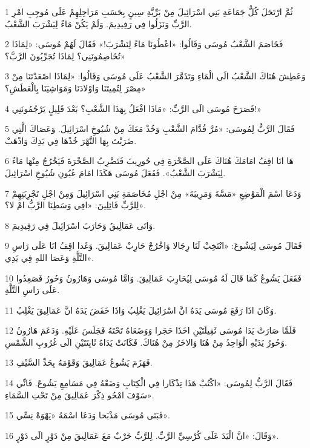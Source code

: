 \par 1 ثُمَّ ارْتَحَلَ كُلُّ جَمَاعَةِ بَنِي اسْرَائِيلَ مِنْ بَرِّيَّةِ سِينٍ بِحَسَبِ مَرَاحِلِهِمْ عَلَى مُوجِبِ امْرِ الرَّبِّ وَنَزَلُوا فِي رَفِيدِيمَ. وَلَمْ يَكُنْ مَاءٌ لِيَشْرَبَ الشَّعْبُ.
\par 2 فَخَاصَمَ الشَّعْبُ مُوسَى وَقَالُوا: «اعْطُونَا مَاءً لِنَشْرَبَ!» فَقَالَ لَهُمْ مُوسَى: «لِمَاذَا تُخَاصِمُونَنِي؟ لِمَاذَا تُجَرِّبُونَ الرَّبَّ؟»
\par 3 وَعَطِشَ هُنَاكَ الشَّعْبُ الَى الْمَاءِ وَتَذَمَّرَ الشَّعْبُ عَلَى مُوسَى وَقَالُوا: «لِمَاذَا اصْعَدْتَنَا مِنْ مِصْرَ لِتُمِيتَنَا وَاوْلادَنَا وَمَوَاشِيَنَا بِالْعَطَشِ؟»
\par 4 فَصَرَخَ مُوسَى الَى الرَّبِّ: «مَاذَا افْعَلُ بِهَذَا الشَّعْبِ؟ بَعْدَ قَلِيلٍ يَرْجُمُونَنِي!»
\par 5 فَقَالَ الرَّبُّ لِمُوسَى: «مُرَّ قُدَّامَ الشَّعْبِ وَخُذْ مَعَكَ مِنْ شُيُوخِ اسْرَائِيلَ. وَعَصَاكَ الَّتِي ضَرَبْتَ بِهَا النَّهْرَ خُذْهَا فِي يَدِكَ وَاذْهَبْ.
\par 6 هَا انَا اقِفُ امَامَكَ هُنَاكَ عَلَى الصَّخْرَةِ فِي حُورِيبَ فَتَضْرِبُ الصَّخْرَةَ فَيَخْرُجُ مِنْهَا مَاءٌ لِيَشْرَبَ الشَّعْبُ». فَفَعَلَ مُوسَى هَكَذَا امَامَ عُيُونِ شُيُوخِ اسْرَائِيلَ.
\par 7 وَدَعَا اسْمَ الْمَوْضِعِ «مَسَّةَ وَمَرِيبَةَ» مِنْ اجْلِ مُخَاصَمَةِ بَنِي اسْرَائِيلَ وَمِنْ اجْلِ تَجْرِبَتِهِمْ لِلرَّبِّ قَائِلِينَ: «افِي وَسَطِنَا الرَّبُّ امْ لا؟».
\par 8 وَاتَى عَمَالِيقُ وَحَارَبَ اسْرَائِيلَ فِي رَفِيدِيمَ.
\par 9 فَقَالَ مُوسَى لِيَشُوعَ: «انْتَخِبْ لَنَا رِجَالا وَاخْرُجْ حَارِبْ عَمَالِيقَ. وَغَدا اقِفُ انَا عَلَى رَاسِ التَّلَّةِ وَعَصَا اللهِ فِي يَدِي».
\par 10 فَفَعَلَ يَشُوعُ كَمَا قَالَ لَهُ مُوسَى لِيُحَارِبَ عَمَالِيقَ. وَامَّا مُوسَى وَهَارُونُ وَحُورُ فَصَعِدُوا عَلَى رَاسِ التَّلَّةِ.
\par 11 وَكَانَ اذَا رَفَعَ مُوسَى يَدَهُ انَّ اسْرَائِيلَ يَغْلِبُ وَاذَا خَفَضَ يَدَهُ انَّ عَمَالِيقَ يَغْلِبُ.
\par 12 فَلَمَّا صَارَتْ يَدَا مُوسَى ثَقِيلَتَيْنِ اخَذَا حَجَرا وَوَضَعَاهُ تَحْتَهُ فَجَلَسَ عَلَيْهِ. وَدَعَمَ هَارُونُ وَحُورُ يَدَيْهِ الْوَاحِدُ مِنْ هُنَا وَالاخَرُ مِنْ هُنَاكَ. فَكَانَتْ يَدَاهُ ثَابِتَتَيْنِ الَى غُرُوبِ الشَّمْسِ.
\par 13 فَهَزَمَ يَشُوعُ عَمَالِيقَ وَقَوْمَهُ بِحَدِّ السَّيْفِ.
\par 14 فَقَالَ الرَّبُّ لِمُوسَى: «اكْتُبْ هَذَا تِذْكَارا فِي الْكِتَابِ وَضَعْهُ فِي مَسَامِعِ يَشُوعَ. فَانِّي سَوْفَ امْحُو ذِكْرَ عَمَالِيقَ مِنْ تَحْتِ السَّمَاءِ».
\par 15 فَبَنَى مُوسَى مَذْبَحا وَدَعَا اسْمَهُ «يَهْوَهْ نِسِّي».
\par 16 وَقَالَ: «انَّ الْيَدَ عَلَى كُرْسِيِّ الرَّبِّ. لِلرَّبِّ حَرْبٌ مَعَ عَمَالِيقَ مِنْ دَوْرٍ الَى دَوْرٍ».

